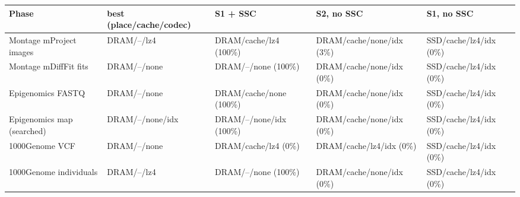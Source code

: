 \begin{tabular}{lllll}
\toprule
Phase & best (place/cache/codec) & S1 + SSC & S2, no SSC & S1, no SSC \\
\midrule
Montage mProject images & DRAM/--/lz4 & DRAM/cache/lz4 (100\%) & DRAM/cache/none/idx (3\%) & SSD/cache/lz4/idx (0\%) \\
Montage mDiffFit fits & DRAM/--/none & DRAM/--/none (100\%) & DRAM/cache/none/idx (0\%) & SSD/cache/lz4/idx (0\%) \\
Epigenomics FASTQ & DRAM/--/none & DRAM/cache/none (100\%) & DRAM/cache/none/idx (0\%) & SSD/cache/lz4/idx (0\%) \\
Epigenomics map (searched) & DRAM/--/none/idx & DRAM/--/none/idx (100\%) & DRAM/cache/none/idx (0\%) & SSD/cache/lz4/idx (0\%) \\
1000Genome VCF & DRAM/--/none & DRAM/cache/lz4 (0\%) & DRAM/cache/lz4/idx (0\%) & SSD/cache/lz4/idx (0\%) \\
1000Genome individuals & DRAM/--/lz4 & DRAM/--/none (100\%) & DRAM/cache/none/idx (0\%) & SSD/cache/lz4/idx (0\%) \\
\bottomrule
\end{tabular}

